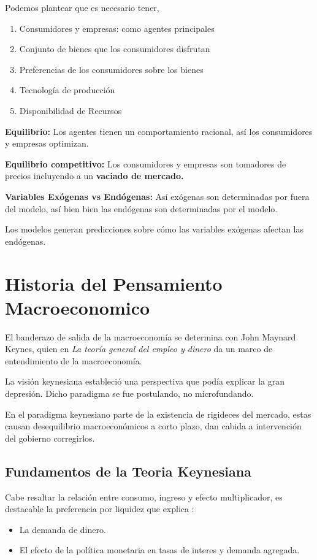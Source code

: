 \begin{definition}
Podemos plantear que es necesario tener, 
\begin{enumerate}
    \item Consumidores y empresas: como agentes principales
    \item Conjunto de bienes que los consumidores disfrutan
    \item Preferencias de los consumidores sobre los bienes
    \item Tecnología de producción
    \item Disponibilidad de Recursos
\end{enumerate}
\end{definition}

\textbf{Equilibrio:} Los agentes tienen un comportamiento racional, así los consumidores y empresas optimizan.

\textbf{Equilibrio competitivo:} Los consumidores y empresas son tomadores de precios incluyendo a un \textbf{vaciado de mercado.}

\textbf{Variables Exógenas vs Endógenas:}
Así exógenas son determinadas por fuera del modelo, así bien bien las endógenas son determinadas por el modelo. 

Los modelos generan predicciones sobre cómo las variables exógenas afectan las endógenas. 

\section{Historia del Pensamiento Macroeconomico}

El banderazo de salida de la macroeconomía se determina con John Maynard Keynes, quien en \textit{La teoría general del empleo y dinero} da un marco de entendimiento de la macroeconomía. 

La visión keynesiana estableció una perspectiva que podía explicar la gran depresión. Dicho paradigma se fue postulando, no microfundando. 

En el paradigma keynesiano parte de la existencia de rigideces del mercado, estas causan desequilibrio macroeconómicos a corto plazo, dan cabida a intervención del gobierno corregirlos. 

\subsection{Fundamentos de la Teoria Keynesiana}

Cabe resaltar la relación entre consumo, ingreso y efecto multiplicador, es destacable la preferencia por liquidez que explica : 
\begin{itemize}
    \item La demanda de dinero.
    \item El efecto de la política monetaria en tasas de interes y demanda agregada.
\end{itemize}

